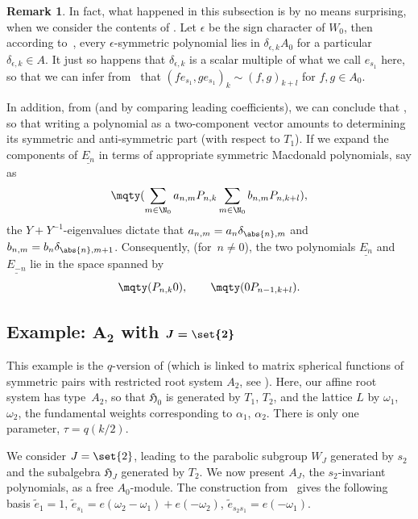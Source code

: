 \documentclass[10pt,a4paper]{amsart}
\theoremstyle{definition}
\newtheorem{Remark}[Theorem]{Remark}
\numberwithin{equation}{section}
\begin{document}
\begin{Remark}
 In fact, what happened in this subsection is by no means surprising,
 when we consider the contents of \cite[Section~5.8]{macdonald}. Let $\epsilon$
 be the sign character of $W_0$, then according to~\cite[Section~5.8.8]{macdonald}, every $\epsilon$-symmetric polynomial
 lies in $\delta_{\epsilon,k}A_0$ for a particular $\delta_{\epsilon,k}\in A$. It just so happens that $\delta_{\epsilon,k}$
 is a scalar multiple of what we call $e_{s_1}$ here, so that
 we can infer from~\cite[Section~5.8.6]{macdonald} that
$(fe_{s_1}, ge_{s_1})_k \sim (f,g)_{k+l}$
 for $f,g\in A_0$.

 In addition, from \cite[Sections~5.8.10f]{macdonald} (and by comparing leading coefficients), we can conclude that
 , so that
 writing a polynomial as a two-component vector amounts to determining
 its symmetric and anti-symmetric part (with respect to $T_1$). If we expand the components of $\underline{E_n}$ in terms of
 appropriate symmetric Macdonald polynomials, say as
 \[
 \mqty(\displaystyle \sum_{m\in\N_0} a_{n,m}P_{n,k}\vspace{1mm}\\
 \displaystyle \sum_{m\in\N_0} b_{n,m}P_{n,k+l}),
 \]
 the $Y+Y^{-1}$-eigenvalues dictate that $a_{n,m}=a_n\delta_{\abs{n},m}$
 and $b_{n,m}=b_n\delta_{\abs{n},m+1}$. Consequently, (for~${n\ne0}$), the
 two polynomials $\underline{E_n}$ and $\underline{E_{-n}}$ lie in the space spanned
 by
 \[
 \mqty(P_{n,k}\\0),\qquad \mqty(0\\P_{n-1,k+l}).
 \]
\end{Remark}

\subsection[Example: A\_2 with J=set2]{Example: $\boldsymbol{ A_2}$ with $\boldsymbol{J=\set{2}}$}
This example is the $q$-version of
\cite[Section~7]{mvpVectorValued} (which is linked to matrix spherical
functions of symmetric pairs with restricted root system $A_2$, see
\cite{shimeno}). Here, our affine root system has type~$A_2$, so that $\mathfrak{H}_0$ is generated by $T_1$, $T_2$, and the lattice
$L$ by $\omega_1$, $\omega_2$, the fundamental weights corresponding to $\alpha_1$, $\alpha_2$. There is only one parameter,
$\tau = q(k/2)$.

We consider $J=\set{2}$, leading to the parabolic subgroup $W_J$ generated
by $s_2$ and the subalgebra $\mathfrak{H}_J$ generated by $T_2$. We now
present $A_J$, the $s_2$-invariant polynomials, as a free $A_0$-module.
The construction from~\cite{pittieSteinberg} gives the following basis
$
\tilde{e}_1=1$, $ \tilde{e}_{s_1}=e(\omega_2-\omega_1) + e(-\omega_2)$, $\tilde{e}_{s_2s_1} = e(-\omega_1)$.
\end{document}
